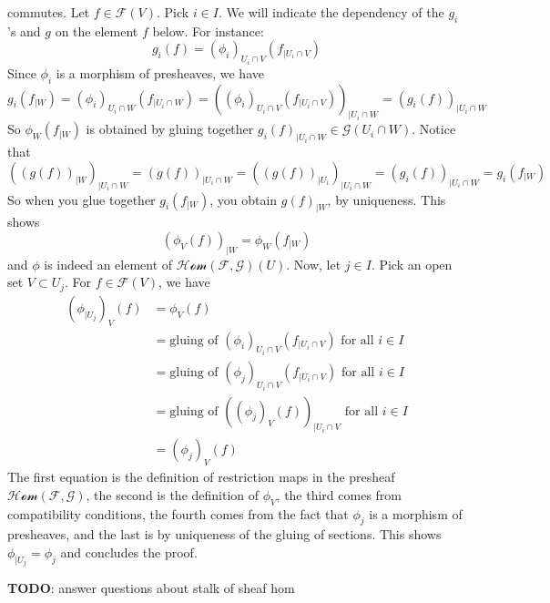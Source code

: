 \documentclass{article}
\DeclareMathOperator{\res}{res}
\newcommand{\todo}{\textbf{TODO}}
\newcommand{\Fsheaf}{\mathscr{F}}
\newcommand{\Gsheaf}{\mathscr{G}}
\newcommand{\sheafHom}{\mathcal{Hom}}
\begin{document}
\begin{center}
\end{center}
commutes. Let $f \in \Fsheaf(V)$. Pick $i \in I$. We will indicate the dependency of the $g_i$'s and $g$ on the element $f$ below. For instance:
\[g_i(f) = (\phi_i)_{U_i \cap V} (f_{\mid U_i \cap V})\]
Since $\phi_i$ is a morphism of presheaves, we have
\[g_i(f_{\mid W}) = (\phi_i)_{U_i \cap W} (f_{\mid U_i \cap W}) = ((\phi_i)_{U_i \cap V} (f_{\mid U_i \cap V}))_{\mid U_i \cap W} = (g_i(f))_{\mid U_i \cap W}\]
So $\phi_W(f_{\mid W})$ is obtained by gluing together $g_i(f)_{\mid U_i\cap W} \in \Gsheaf(U_i \cap W)$. Notice that
\[((g(f))_{\mid W})_{\mid U_i \cap W} = (g(f))_{\mid U_i \cap W} = ((g(f))_{\mid U_i})_{\mid U_i \cap W} = (g_i(f))_{\mid U_i \cap W} = g_i(f_{\mid W})\]
So when you glue together $g_i (f_{\mid W})$, you obtain $g(f)_{\mid W}$, by uniqueness. This shows
\[(\phi_V (f))_{\mid W} = \phi_W(f_{\mid W})\]
and $\phi$ is indeed an element of $\sheafHom(\Fsheaf,\Gsheaf)(U)$. Now, let $j\in I$. Pick an open set $V \subset U_j$. For $f \in \Fsheaf(V)$, we have
\begin{align*}
    (\phi_{\mid U_j})_V (f) & = \phi_V (f)\\
    & = \text{gluing of } (\phi_i)_{U_i \cap V} (f_{\mid U_i \cap V}) \text{ for all $i \in I$} \\ 
    & = \text{gluing of } (\phi_j)_{U_i \cap V} (f_{\mid U_i \cap V}) \text{ for all $i \in I$} \\
    & = \text{gluing of } ((\phi_j )_V (f))_{\mid U_i \cap V} \text{ for all $i \in I$} \\
    & = (\phi_j)_V(f)
\end{align*}
The first equation is the definition of restriction maps in the presheaf $\sheafHom(\Fsheaf,\Gsheaf)$, the second is the definition of $\phi_V$, the third comes from compatibility conditions, the fourth comes from the fact that $\phi_j$ is a morphism of presheaves, and the last is by uniqueness of the gluing of sections. This shows $\phi_{\mid U_j} = \phi_j$ and concludes the proof.

\todo : answer questions about stalk of sheaf hom
\end{document}
